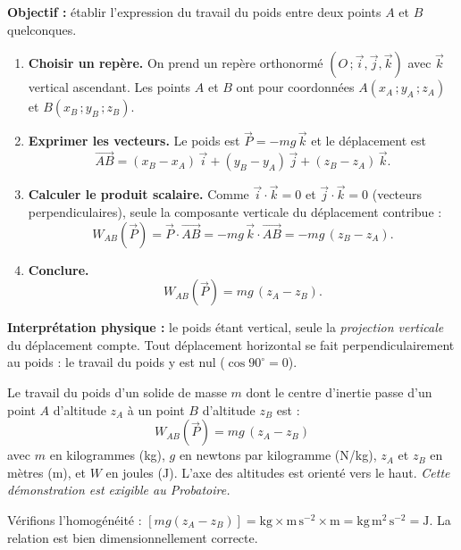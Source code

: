 \documentclass[11pt]{article}
\providecommand{\degree}{^{\circ}}
\begin{document}
\begin{experience}
\textbf{Objectif :} établir l'expression du travail du poids entre deux points $A$ et $B$ quelconques.
\begin{enumerate}
\item \textbf{Choisir un repère.} On prend un repère orthonormé $(O\,;\vec{i},\vec{j},\vec{k})$ avec $\vec{k}$ vertical ascendant. Les points $A$ et $B$ ont pour coordonnées $A(x_A\,;y_A\,;z_A)$ et $B(x_B\,;y_B\,;z_B)$.
\item \textbf{Exprimer les vecteurs.} Le poids est $\vec{P} = -mg\,\vec{k}$ et le déplacement est
\[ \overrightarrow{AB} = (x_B - x_A)\,\vec{i} + (y_B - y_A)\,\vec{j} + (z_B - z_A)\,\vec{k}. \]
\item \textbf{Calculer le produit scalaire.} Comme $\vec{i}\cdot\vec{k} = 0$ et $\vec{j}\cdot\vec{k} = 0$ (vecteurs perpendiculaires), seule la composante verticale du déplacement contribue :
\[ W_{AB}(\vec{P}) = \vec{P}\cdot\overrightarrow{AB} = -mg\,\vec{k}\cdot\overrightarrow{AB} = -mg\,(z_B - z_A). \]
\item \textbf{Conclure.}
\[ W_{AB}(\vec{P}) = mg\,(z_A - z_B). \]
\end{enumerate}
\textbf{Interprétation physique :} le poids étant vertical, seule la \emph{projection verticale} du déplacement compte. Tout déplacement horizontal se fait perpendiculairement au poids : le travail du poids y est nul ($\cos 90\degree = 0$).
\end{experience}

\begin{propriete}
Le travail du poids d'un solide de masse $m$ dont le centre d'inertie passe d'un point $A$ d'altitude $z_A$ à un point $B$ d'altitude $z_B$ est :
\[ \boxed{W_{AB}(\vec{P}) = mg\,(z_A - z_B)} \]
avec $m$ en kilogrammes (kg), $g$ en newtons par kilogramme (N/kg), $z_A$ et $z_B$ en mètres (m), et $W$ en joules (J). L'axe des altitudes est orienté vers le haut. \emph{Cette démonstration est exigible au Probatoire.}
\end{propriete}

Vérifions l'homogénéité : $[mg(z_A-z_B)] = \mathrm{kg}\times\mathrm{m\,s^{-2}}\times\mathrm{m} = \mathrm{kg\,m^2\,s^{-2}} = \mathrm{J}$. La relation est bien dimensionnellement correcte.
\end{document}
